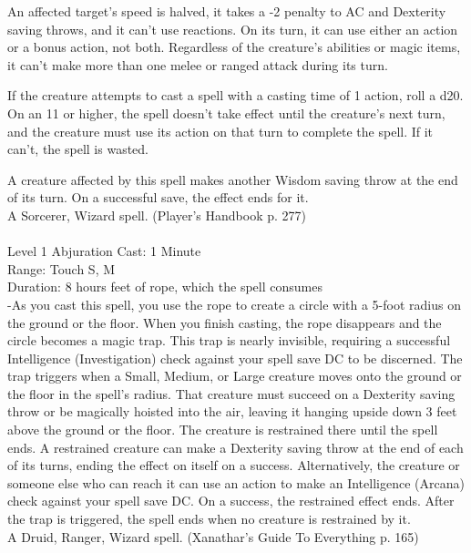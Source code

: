 \documentclass[10pt,twocolumn]{report}
\begin{document}
An affected target’s speed is halved, it takes a -2 penalty to AC and Dexterity saving throws, and it can’t use reactions. On its turn, it can use either an action or a bonus action, not both. Regardless of the creature’s abilities or magic items, it can’t make more than one melee or ranged attack during its turn.

If the creature attempts to cast a spell with a casting time of 1 action, roll a d20. On an 11 or higher, the spell doesn’t take effect until the creature’s next turn, and the creature must use its action on that turn to complete the spell. If it can’t, the spell is wasted.

A creature affected by this spell makes another Wisdom saving throw at the end of its turn. On a successful save, the effect ends for it.\\
A Sorcerer, Wizard spell. (Player's Handbook p. 277) \\


 \\
Level 1 \quad Abjuration \quad Cast: 1 Minute\\
Range: Touch \quad S, M\\
Duration: 8 hours  feet of rope, which the spell consumes\\
-As you cast this spell, you use the rope to create a circle with a 5-foot radius on the ground or the floor. When you finish casting, the rope disappears and the circle becomes a magic trap.
This trap is nearly invisible, requiring a successful Intelligence (Investigation) check against your spell save DC to be discerned.
The trap triggers when a Small, Medium, or Large creature moves onto the ground or the floor in the spell’s radius. That creature must succeed on a Dexterity saving throw or be magically hoisted into the air, leaving it hanging upside down 3 feet above the ground or the floor. The creature is restrained there until the spell ends.
A restrained creature can make a Dexterity saving throw at the end of each of its turns, ending the effect on itself on a success. Alternatively, the creature or someone else who can reach it can use an action to make an Intelligence (Arcana) check against your spell save DC. On a success, the restrained effect ends.
After the trap is triggered, the spell ends when no creature is restrained by it.\\
A Druid, Ranger, Wizard spell. (Xanathar's Guide To Everything p. 165) \\
\end{document}

